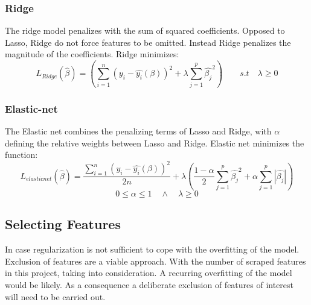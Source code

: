 \documentclass[12pt,a4paper]{article}
\begin{document}
\subsubsection{Ridge}
The ridge model penalizes with the sum of squared coefficients. Opposed to Lasso, Ridge do not force features to be omitted. Instead Ridge penalizes the magnitude of the coefficients. Ridge minimizes:
$$L_{Ridge}(\hat{\beta}) = \left(\sum_{i=1}^{n} (y_i-\hat{y_i}(\beta))^2+\lambda\sum_{j=1}^{p}\hat{\beta_j}^2\right) \qquad s.t \quad \lambda \geq 0 $$ 


\subsubsection{Elastic-net}
The Elastic net combines the penalizing terms of Lasso and Ridge, with $\alpha$ defining the relative weights between Lasso and Ridge. Elastic net minimizes the function: 
$$L_{elasticnet}(\hat{\beta}) = \frac{\sum_{i=1}^{n}\left(y_i-\hat{y_i}(\beta)\right)^2}{2n} + \lambda\left(\frac{1-\alpha}{2}\sum_{j=1}^{p}\hat{\beta_j}^2+\alpha\sum_{j=1}^{p}|\hat{\beta_j}|\right)$$
$$0 \leq \alpha \leq 1 \quad \wedge \quad \lambda \geq 0$$

\subsection{Selecting Features}
In case regularization is not sufficient to cope with the overfitting of the model. Exclusion of features are a viable approach. With the number of scraped features in this project, taking into consideration. A recurring overfitting of the model would be likely. As a consequence a deliberate exclusion of features of interest will need to be carried out.    
\end{document}

